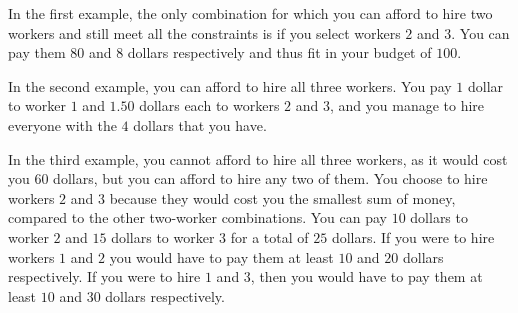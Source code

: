In the first example, the only combination for which you can afford to hire two workers and still meet all the constraints is if you select workers $2$ and $3$. You can pay them $80$ and $8$ dollars respectively and thus fit in your budget of $100$.

In the second example, you can afford to hire all three workers. You pay $1$ dollar to worker $1$ and $1.50$ dollars each to workers $2$ and $3$, and you manage to hire everyone with the $4$ dollars that you have.

In the third example, you cannot afford to hire all three workers, as it would cost you $60$ dollars, but you can afford to hire any two of them. You choose to hire workers $2$ and $3$ because they would cost you the smallest sum of money, compared to the other two-worker combinations. You can pay $10$ dollars to worker $2$ and $15$ dollars to worker $3$ for a total of $25$ dollars. If you were to hire workers $1$ and $2$ you would have to pay them at least $10$ and $20$ dollars respectively. If you were to hire $1$ and $3$, then you would have to pay them at least $10$ and $30$ dollars respectively.